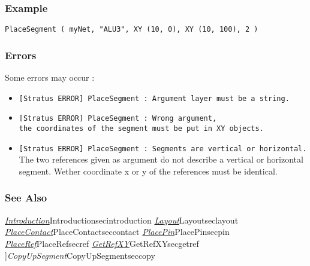 \subsubsection{Example}

\begin{verbatim}
PlaceSegment ( myNet, "ALU3", XY (10, 0), XY (10, 100), 2 )
\end{verbatim}

\subsubsection{Errors}
    
Some errors may occur :
\begin{itemize}
    \item \verb-[Stratus ERROR] PlaceSegment : Argument layer must be a string.-
    \item \verb-[Stratus ERROR] PlaceSegment : Wrong argument,-\\\verb-the coordinates of the segment must be put in XY objects.-
    \item \verb-[Stratus ERROR] PlaceSegment : Segments are vertical or horizontal.-\\The two references given as argument do not describe a vertical or horizontal segment. Wether coordinate x or y of the references must be identical. 
\end{itemize}

\begin{htmlonly}
        
\subsubsection{See Also}

\hyperref[ref]{\emph{Introduction}}{}{Introduction}{secintroduction}
\hyperref[ref]{\emph{Layout}}{}{Layout}{seclayout}
\hyperref[ref]{\emph{PlaceContact}}{}{PlaceContact}{seccontact}
\hyperref[ref]{\emph{PlacePin}}{}{PlacePin}{secpin}
\hyperref[ref]{\emph{PlaceRef}}{}{PlaceRef}{secref}
\hyperref[ref]{\emph{GetRefXY}}{}{GetRefXY}{secgetref}
\hyperref[ref]]{\emph{CopyUpSegment}}{}{CopyUpSegment}{seccopy}

\end{htmlonly}
